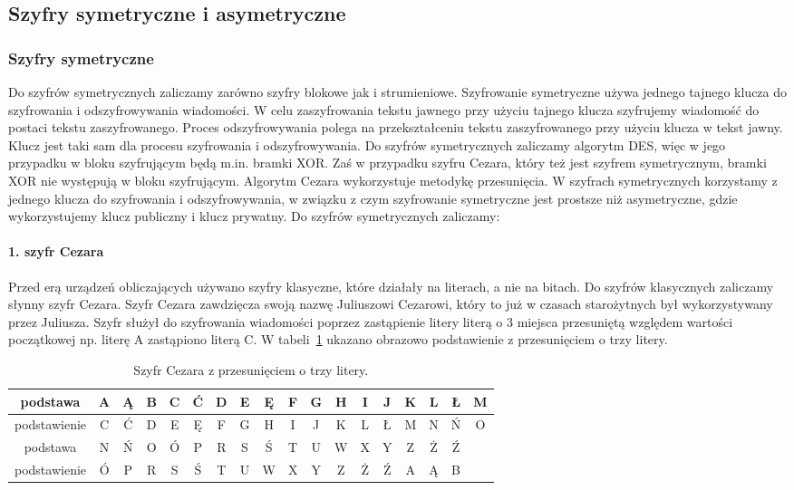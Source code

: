 \documentclass[12p]{article}
\begin{document}
\subsection{Szyfry symetryczne i asymetryczne}

\subsubsection{Szyfry symetryczne}
\quad Do szyfrów symetrycznych zaliczamy zarówno szyfry blokowe jak i strumieniowe. Szyfrowanie symetryczne używa jednego tajnego klucza do szyfrowania i odszyfrowywania wiadomości. W celu zaszyfrowania tekstu jawnego przy użyciu tajnego klucza szyfrujemy wiadomość do postaci tekstu zaszyfrowanego. Proces odszyfrowywania polega na przekształceniu tekstu zaszyfrowanego przy użyciu klucza w tekst jawny. Klucz jest taki sam dla procesu szyfrowania i odszyfrowywania. Do szyfrów symetrycznych zaliczamy algorytm DES, więc w jego przypadku w bloku szyfrującym będą m.in. bramki XOR. Zaś w przypadku szyfru Cezara, który też jest szyfrem symetrycznym, bramki XOR nie występują w bloku szyfrującym. Algorytm Cezara wykorzystuje metodykę przesunięcia. W szyfrach symetrycznych korzystamy z jednego klucza do szyfrowania i odszyfrowywania, w związku z czym szyfrowanie symetryczne jest prostsze niż asymetryczne, gdzie wykorzystujemy klucz publiczny i klucz prywatny. Do szyfrów symetrycznych zaliczamy:


\paragraph{1. szyfr Cezara}
\quad 

Przed erą urządzeń obliczających używano szyfry klasyczne, które działały na literach, a nie na bitach. Do szyfrów klasycznych zaliczamy słynny szyfr Cezara. Szyfr Cezara zawdzięcza swoją nazwę Juliuszowi Cezarowi, który to już w czasach starożytnych był wykorzystywany przez Juliusza. Szyfr służył do szyfrowania wiadomości poprzez zastąpienie litery literą o 3 miejsca przesuniętą względem wartości początkowej np. literę A zastąpiono literą C. W tabeli~\ref{cezar} ukazano obrazowo podstawienie z przesunięciem o trzy litery.

\begin{table}[H]
\centering
\begin{tabular}{|c|c|c|c|c|c|c|c|c|c|c|c|c|c|c|c|c|c|}
\hline
podstawa & A & Ą & B & C & Ć & D & E & Ę & F & G & H & I & J & K & L & Ł & M \\
\hline 
\hline
podstawienie & C & Ć & D & E & Ę & F & G & H & I & J & K & L & Ł & M & N & Ń & O \\
\hline
\hline
podstawa & N & Ń & O & Ó & P & R & S & Ś & T & U & W & X & Y & Z & Ż & Ź & \\
\hline 
\hline
podstawienie & Ó & P & R & S & Ś & T & U & W & X & Y & Z & Ż & Ź & A & Ą & B & \\
\hline
\end{tabular}
\caption{Szyfr Cezara z przesunięciem o trzy litery.}~\label{cezar}
\end{table}
\end{document}
